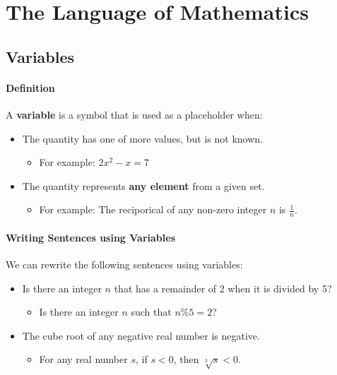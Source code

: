 \section{The Language of Mathematics}
\hrulefill
\subsection{Variables}

\paragraph*{Definition} A \textbf{variable} is a symbol that is used as a placeholder when:
\begin{itemize}
    \item The quantity has one of more values, but is not known.
    \begin{itemize}
        \item For example: $2x^2 - x = 7$
    \end{itemize}
    \item The quantity represents \textbf{any element} from a given set.
    \begin{itemize}
        \item For example: The reciporical of any non-zero integer $n$ is $\frac{1}{n}$.
    \end{itemize}
\end{itemize}

\paragraph*{Writing Sentences using Variables}
We can rewrite the following sentences using variables:
\begin{itemize}
    \item Is there an integer $n$ that has a remainder of 2 when it is divided by 5?
    \begin{itemize}
        \item Is there an integer $n$ such that $n \% 5 = 2$?
    \end{itemize}
    \item The cube root of any negative real number is negative.
    \begin{itemize}
        \item For any real number $s$, if $s < 0$, then $\sqrt[3]{s} < 0$.
    \end{itemize}
\end{itemize}

